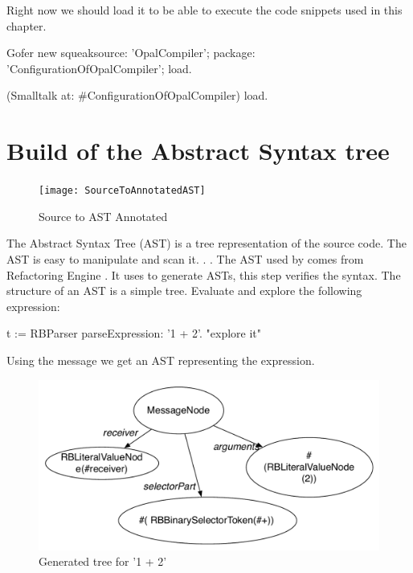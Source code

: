 \documentclass[a4paper,10pt,twoside]{book}
\begin{document}
Right now we should load it to be able to execute the code snippets used in this chapter.
\begin{code}{}
	Gofer new
		squeaksource: 'OpalCompiler';
		package: 'ConfigurationOfOpalCompiler';
		load.
		
	(Smalltalk at: #ConfigurationOfOpalCompiler) load.
\end{code}


\section{Build of the Abstract Syntax tree}

\begin{figure}[ht]\centering
	\texttt{[image: SourceToAnnotatedAST]}
	\caption{Source to AST Annotated  }
\end{figure}

The Abstract Syntax Tree (AST) is a tree representation of the source code. The AST is easy to manipulate and scan it.
. .
The AST used by \opal comes from Refactoring Engine . It uses  to generate ASTs, this step verifies the syntax. The structure of an AST is a simple tree. Evaluate and explore the following expression:

\begin{code}{}
t := RBParser parseExpression: '1 + 2'.
"explore it"

\end{code}


Using the message  we get an AST representing the expression.

\begin{figure}[ht]
	\centering
	\includegraphics[width=0.7\linewidth]{SimpleAtomicExpression}
	\caption{Generated tree for  '1 + 2'  }
\end{figure}
\end{document}
